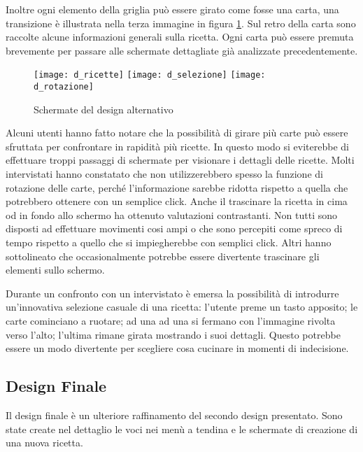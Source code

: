 Inoltre ogni elemento della griglia può essere girato come fosse una carta, una transizione è illustrata nella terza immagine in figura \ref{fig:design_alternativo}.
Sul retro della carta sono raccolte alcune informazioni generali sulla ricetta.
Ogni carta può essere premuta brevemente per passare alle schermate dettagliate già analizzate precedentemente.

\begin{figure}[ht]
  \begin{center}
    \texttt{[image: d\_ricette]}
    \texttt{[image: d\_selezione]}
    \texttt{[image: d\_rotazione]}
    \caption{Schermate del design alternativo}
    \label{fig:design_alternativo}
  \end{center}
\end{figure}

Alcuni utenti hanno fatto notare che la possibilità di girare più carte può essere sfruttata per confrontare in rapidità più ricette.
In questo modo si eviterebbe di effettuare troppi passaggi di schermate per visionare i dettagli delle ricette.
Molti intervistati hanno constatato che non utilizzerebbero spesso la funzione di rotazione delle carte, perché l'informazione sarebbe ridotta rispetto a quella che potrebbero ottenere con un semplice click.
Anche il trascinare la ricetta in cima od in fondo allo schermo ha ottenuto valutazioni contrastanti.
Non tutti sono disposti ad effettuare movimenti cosi ampi o che sono percepiti come spreco di tempo rispetto a quello che si impiegherebbe con semplici click.
Altri hanno sottolineato che occasionalmente potrebbe essere divertente trascinare gli elementi sullo schermo.

Durante un confronto con un intervistato è emersa la possibilità di introdurre un'innovativa selezione casuale di una ricetta: l'utente preme un tasto apposito; le carte cominciano a ruotare; ad una ad una si fermano con l'immagine rivolta verso l'alto; l'ultima rimane girata mostrando i suoi dettagli.
Questo potrebbe essere un modo divertente per scegliere cosa cucinare in momenti di indecisione.


\clearpage
\subsection{Design Finale}
Il design finale è un ulteriore raffinamento del secondo design presentato.
Sono state create nel dettaglio le voci nei menù a tendina e le schermate di creazione di una nuova ricetta.

